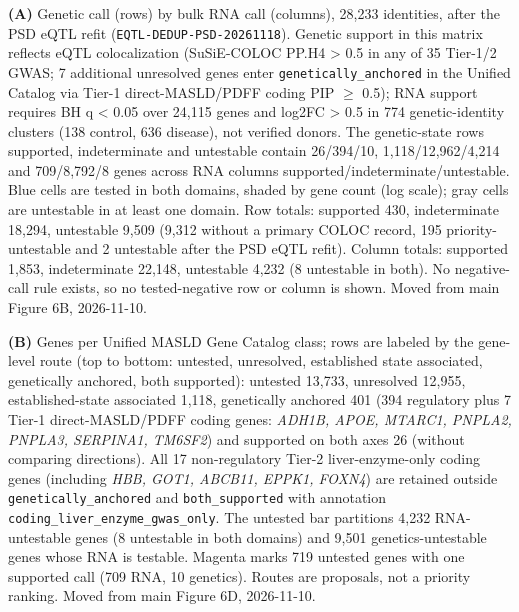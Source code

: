 \textbf{(A)} Genetic call (rows) by bulk RNA call (columns), 28,233 identities, after the PSD eQTL refit (\texttt{EQTL-DEDUP-PSD-20261118}). Genetic support in this matrix reflects eQTL colocalization (SuSiE-COLOC PP.H4 \textgreater{} 0.5 in any of 35 Tier-1/2 GWAS; 7 additional unresolved genes enter \texttt{genetically\_anchored} in the Unified Catalog via Tier-1 direct-MASLD/PDFF coding PIP $\ge$ 0.5); RNA support requires BH q \textless{} 0.05 over 24,115 genes and \textbar log2FC\textbar{} \textgreater{} 0.5 in 774 genetic-identity clusters (138 control, 636 disease), not verified donors. The genetic-state rows supported, indeterminate and untestable contain 26/394/10, 1,118/12,962/4,214 and 709/8,792/8 genes across RNA columns supported/indeterminate/untestable. Blue cells are tested in both domains, shaded by gene count (log scale); gray cells are untestable in at least one domain. Row totals: supported 430, indeterminate 18,294, untestable 9,509 (9,312 without a primary COLOC record, 195 priority-untestable and 2 untestable after the PSD eQTL refit). Column totals: supported 1,853, indeterminate 22,148, untestable 4,232 (8 untestable in both). No negative-call rule exists, so no tested-negative row or column is shown. Moved from main Figure 6B, 2026-11-10.

\textbf{(B)} Genes per Unified MASLD Gene Catalog class; rows are labeled by the gene-level route (top to bottom: untested, unresolved, established state associated, genetically anchored, both supported): untested 13,733, unresolved 12,955, established-state associated 1,118, genetically anchored 401 (394 regulatory plus 7 Tier-1 direct-MASLD/PDFF coding genes: \emph{ADH1B, APOE, MTARC1, PNPLA2, PNPLA3, SERPINA1, TM6SF2}) and supported on both axes 26 (without comparing directions). All 17 non-regulatory Tier-2 liver-enzyme-only coding genes (including \emph{HBB, GOT1, ABCB11, EPPK1, FOXN4}) are retained outside \texttt{genetically\_anchored} and \texttt{both\_supported} with annotation \texttt{coding\_liver\_enzyme\_gwas\_only}. The untested bar partitions 4,232 RNA-untestable genes (8 untestable in both domains) and 9,501 genetics-untestable genes whose RNA is testable. Magenta marks 719 untested genes with one supported call (709 RNA, 10 genetics). Routes are proposals, not a priority ranking. Moved from main Figure 6D, 2026-11-10.

